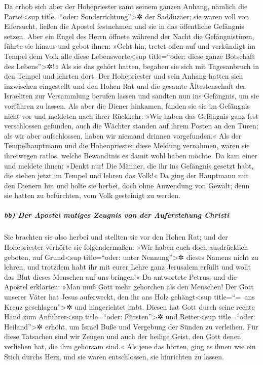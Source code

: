  Da erhob sich aber der Hohepriester samt seinem ganzen
Anhang, nämlich die Partei\textless sup title=``oder:
Sonderrichtung''\textgreater✲ der Sadduzäer; sie waren voll von
Eifersucht,  ließen die Apostel festnehmen und sie in das
öffentliche Gefängnis setzen.  Aber ein Engel des Herrn
öffnete während der Nacht die Gefängnistüren, führte sie hinaus und
gebot ihnen:  »Geht hin, tretet offen auf und verkündigt
im Tempel dem Volk alle diese Lebensworte\textless sup title=``oder:
diese ganze Botschaft des Lebens''\textgreater✲!«  Als
sie das gehört hatten, begaben sie sich mit Tagesanbruch in den Tempel
und lehrten dort. Der Hohepriester und sein Anhang hatten sich
inzwischen eingestellt und den Hohen Rat und die gesamte Ältestenschaft
der Israeliten zur Versammlung berufen lassen und sandten nun ins
Gefängnis, um sie vorführen zu lassen.  Als aber die
Diener hinkamen, fanden sie sie im Gefängnis nicht vor und meldeten nach
ihrer Rückkehr:  »Wir haben das Gefängnis ganz fest
verschlossen gefunden, auch die Wächter standen auf ihrem Posten an den
Türen; als wir aber aufschlossen, haben wir niemand drinnen
vorgefunden.«  Als der Tempelhauptmann und die
Hohenpriester diese Meldung vernahmen, waren sie ihretwegen ratlos,
welche Bewandtnis es damit wohl haben möchte.  Da kam
einer und meldete ihnen: »Denkt nur! Die Männer, die ihr ins Gefängnis
gesetzt habt, die stehen jetzt im Tempel und lehren das Volk!«
 Da ging der Hauptmann mit den Dienern hin und holte sie
herbei, doch ohne Anwendung von Gewalt; denn sie hatten zu befürchten,
vom Volk gesteinigt zu werden.

\hypertarget{bb-der-apostel-mutiges-zeugnis-von-der-auferstehung-christi}{%
\subparagraph{bb) Der Apostel mutiges Zeugnis von der Auferstehung
Christi}\label{bb-der-apostel-mutiges-zeugnis-von-der-auferstehung-christi}}

 Sie brachten sie also herbei und stellten sie vor den
Hohen Rat; und der Hohepriester verhörte sie folgendermaßen:
 »Wir haben euch doch ausdrücklich geboten, auf
Grund\textless sup title=``oder: unter Nennung''\textgreater✲ dieses
Namens nicht zu lehren, und trotzdem habt ihr mit eurer Lehre ganz
Jerusalem erfüllt und wollt das Blut dieses Menschen auf uns bringen!«
 Da antwortete Petrus, und die Apostel erklärten: »Man
muß Gott mehr gehorchen als den Menschen!  Der Gott
unserer Väter hat Jesus auferweckt, den ihr ans Holz
gehängt\textless sup title=``=~ans Kreuz geschlagen''\textgreater✲ und
hingerichtet habt.  Diesen hat Gott durch seine rechte
Hand zum Anführer\textless sup title=``oder: Fürsten''\textgreater✲ und
Retter\textless sup title=``oder: Heiland''\textgreater✲ erhöht, um
Israel Buße und Vergebung der Sünden zu verleihen.  Für
diese Tatsachen sind wir Zeugen und auch der heilige Geist, den Gott
denen verliehen hat, die ihm gehorsam sind.«  Als jene
das hörten, ging es ihnen wie ein Stich durchs Herz, und sie waren
entschlossen, sie hinrichten zu lassen.

